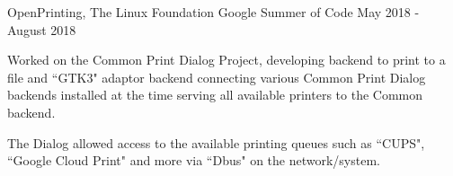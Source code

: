 \begin{cventries}

  \cventry
    {OpenPrinting, The Linux Foundation} %
    {Google Summer of Code} %
    {} %
    {May 2018 - August 2018} %
    {
      \begin{cvitems} %
        \item {Worked on the Common Print Dialog Project, developing backend to print to a file and ``GTK3" adaptor backend connecting various Common Print Dialog backends installed at the time serving all available printers to the Common backend.}
        \item {The Dialog allowed access to the available printing queues such as ``CUPS", ``Google Cloud Print" and more via ``Dbus" on the network/system.}
      \end{cvitems}
    }



\end{cventries}
